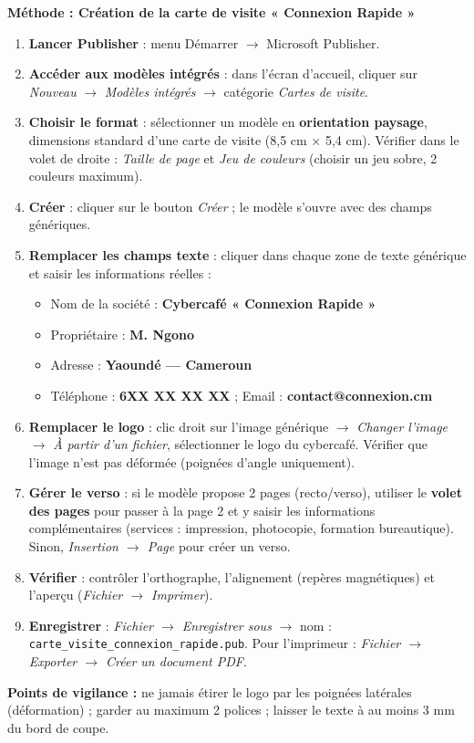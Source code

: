 \documentclass[11pt]{article}
\begin{document}
\begin{corrige}
\textbf{Méthode : Création de la carte de visite « Connexion Rapide »}
\begin{enumerate}
    \item \textbf{Lancer Publisher} : menu Démarrer $\rightarrow$ Microsoft Publisher.
    \item \textbf{Accéder aux modèles intégrés} : dans l'écran d'accueil, cliquer sur \textit{Nouveau} $\rightarrow$ \textit{Modèles intégrés} $\rightarrow$ catégorie \textit{Cartes de visite}.
    \item \textbf{Choisir le format} : sélectionner un modèle en \textbf{orientation paysage}, dimensions standard d'une carte de visite (8,5 cm $\times$ 5,4 cm). Vérifier dans le volet de droite : \textit{Taille de page} et \textit{Jeu de couleurs} (choisir un jeu sobre, 2 couleurs maximum).
    \item \textbf{Créer} : cliquer sur le bouton \textit{Créer} ; le modèle s'ouvre avec des champs génériques.
    \item \textbf{Remplacer les champs texte} : cliquer dans chaque zone de texte générique et saisir les informations réelles :
    \begin{itemize}
        \item Nom de la société : \textbf{Cybercafé « Connexion Rapide »}
        \item Propriétaire : \textbf{M. Ngono}
        \item Adresse : \textbf{Yaoundé — Cameroun}
        \item Téléphone : \textbf{6XX XX XX XX} ; Email : \textbf{contact@connexion.cm}
    \end{itemize}
    \item \textbf{Remplacer le logo} : clic droit sur l'image générique $\rightarrow$ \textit{Changer l'image} $\rightarrow$ \textit{À partir d'un fichier}, sélectionner le logo du cybercafé. Vérifier que l'image n'est pas déformée (poignées d'angle uniquement).
    \item \textbf{Gérer le verso} : si le modèle propose 2 pages (recto/verso), utiliser le \textbf{volet des pages} pour passer à la page 2 et y saisir les informations complémentaires (services : impression, photocopie, formation bureautique). Sinon, \textit{Insertion $\rightarrow$ Page} pour créer un verso.
    \item \textbf{Vérifier} : contrôler l'orthographe, l'alignement (repères magnétiques) et l'aperçu (\textit{Fichier $\rightarrow$ Imprimer}).
    \item \textbf{Enregistrer} : \textit{Fichier $\rightarrow$ Enregistrer sous} $\rightarrow$ nom : \texttt{carte\_visite\_connexion\_rapide.pub}. Pour l'imprimeur : \textit{Fichier $\rightarrow$ Exporter $\rightarrow$ Créer un document PDF}.
\end{enumerate}

\textbf{Points de vigilance :} ne jamais étirer le logo par les poignées latérales (déformation) ; garder au maximum 2 polices ; laisser le texte à au moins 3 mm du bord de coupe.
\end{corrige}
\end{document}
